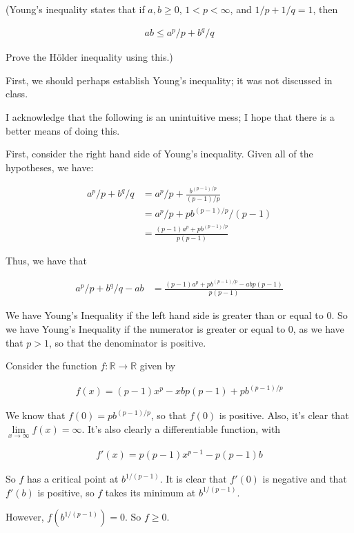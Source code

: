 \documentclass[a4paper,12pt]{article}
\newcommand{\R}{\mathbb{R}}
\begin{document}
(Young's inequality states that if $a,b \geq 0$, $1 < p < \infty$, and $1/p + 1/q =1$, then

\begin{align*}
ab \leq a^p/p + b^q/q
\end{align*}

Prove the H{\"o}lder inequality using this.)

First, we should perhaps establish Young's inequality; it was not discussed in class.

I acknowledge that the following is an unintuitive mess; I hope that there is a better means of doing this.

First, consider the right hand side of Young's inequality. Given all of the hypotheses, we have:

\begin{align*}
a^p/p + b^q/q &= a^p/p +\frac{b^{(p-1)/p}}{(p-1)/p}\\
&=a^p/p + pb^{(p-1)/p}/(p-1)\\
&=\frac{(p-1)a^p+pb^{(p-1)/p}}{p(p-1)}
\end{align*}

Thus, we have that

\begin{align*}
a^p/p+b^q/q -ab &= \frac{(p-1)a^p+pb^{(p-1)/p} -abp(p-1)}{p(p-1)}
\end{align*}

We have Young's Inequality if the left hand side is greater than or equal to $0$. So we have Young's Inequality if the numerator is greater or equal to $0$, as we have that $p>1$, so that the denominator is positive.

Consider the function $f: \R \to \R$ given by 

\begin{align*}
f(x) = (p-1)x^p -xbp(p-1)+pb^{(p-1)/p}
\end{align*}

We know that $f(0) = pb^{(p-1)/p}$, so that $f(0)$ is positive. Also, it's clear that $\lim\limits_{x \to \infty} f(x) = \infty$. It's also clearly a differentiable function, with

\begin{align*}
f'(x) = p(p-1)x^{p-1} - p(p-1)b
\end{align*}

So $f$ has a critical point at $b^{1/(p-1)}$. It is clear that $f'(0)$ is negative and that $f'(b)$ is positive, so $f$ takes its minimum at $b^{1/(p-1)}$.

However, $f(b^{1/(p-1)})=0$. So $f \geq 0$.
\end{document}
